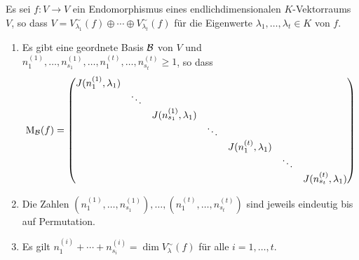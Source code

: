 \begin{theorem}
  Es sei $f \colon V \to V$ ein Endomorphismus eines endlichdimensionalen $K$-Vektorraums $V$, so dass $V = V^\sim_{\lambda_1}(f) \oplus \dotsb \oplus V^\sim_{\lambda_t}(f)$ für die Eigenwerte $\lambda_1, \dotsc, \lambda_t \in K$ von $f$.
  \begin{enumerate}[leftmargin=*, label=\roman*)]
    \item
      Es gibt eine geordnete Basis $\mathcal{B}$ von $V$ und $n^{(1)}_1, \dotsc, n^{(1)}_{s_1}, \dotsc, n^{(t)}_1, \dotsc, n^{(t)}_{s_t} \geq 1$, so dass
      \[
        \mathrm{M}_{\mathcal{B}}(f)
        =
        \begin{pmatrix}
          J(n^{(1)}_1, \lambda_1) &         &                             &         &                         &         &                             \\
                                  & \ddots  &                             &         &                         &         &                             \\
                                  &         & J(n^{(1)}_{s_1}, \lambda_1) &         &                         &         &                             \\
                                  &         &                             & \ddots  &                         &         &                             \\
                                  &         &                             &         & J(n^{(t)}_1, \lambda_1) &         &                             \\
                                  &         &                             &         &                         & \ddots  &                             \\
                                  &         &                             &         &                         &         & J(n^{(t)}_{s_t}, \lambda_1)
        \end{pmatrix}
      \]
    \item
      Die Zahlen $(n^{(1)}_1, \dotsc, n^{(1)}_{s_1}), \dotsc, (n^{(t)}_1, \dotsc, n^{(t)}_{s_t})$ sind jeweils eindeutig bis auf Permutation.
    \item
      Es gilt $n^{(i)}_1 + \dotsb + n^{(i)}_{s_i} = \dim V^\sim_\lambda(f)$ für alle $i = 1, \dotsc, t$.
  \end{enumerate}
\end{theorem}








